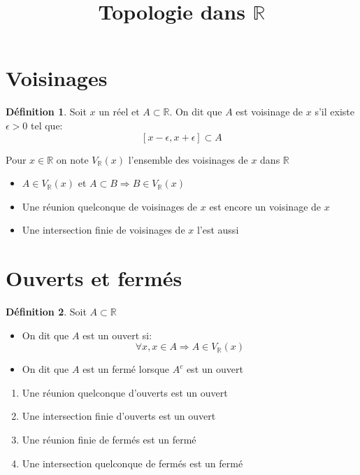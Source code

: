 \documentclass[fleqn]{article}
\title{Topologie dans $\mathbb{R}$}
\date{}
\theoremstyle{definition} \newtheorem*{defi}{D\'efinition}
\theoremstyle{definition} \newtheorem*{adh}{Caract\'erisation s\'equentielle de l'adh\'erence}
\theoremstyle{definition} \newtheorem*{fermitude}{Caract\'erisation s\'equentielle de la fermitude}
\theoremstyle{plain} \newtheorem*{theo}{Th\'eor\`eme}
\begin{document}
\maketitle

\section{Voisinages}
\begin{defi}
	Soit $x$ un r\'eel et $A \subset \mathbb{R}$. On dit que $A$ est voisinage de $x$ s'il existe $\epsilon > 0$ tel que:
	\[[x-\epsilon, x+\epsilon] \subset A\]
\end{defi}
Pour $x \in \mathbb{R}$ on note $V_\mathbb{R}(x)$ l'ensemble des voisinages de $x$ dans $\mathbb{R}$ \\
\begin{itemize}
	\item $A \in V_\mathbb{R}(x)$ et $A \subset B \Rightarrow B \in V_\mathbb{R}(x)$
	\item Une r\'eunion quelconque de voisinages de $x$ est encore un voisinage de $x$
	\item Une intersection finie de voisinages de $x$ l'est aussi
\end{itemize}

\section{Ouverts et ferm\'es}
\begin{defi}
	Soit $A \subset \mathbb{R}$
	\begin{itemize}
		\item On dit que $A$ est un ouvert si:
			\[\forall x, x \in A \Rightarrow A \in V_\mathbb{R}(x)\]
		\item On dit que $A$ est un ferm\'e lorsque $A^c$ est un ouvert \\
	\end{itemize}
\end{defi}
\begin{enumerate}
	\item Une r\'eunion quelconque d'ouverts est un ouvert
	\item Une intersection finie d'ouverts est un ouvert
	\item Une r\'eunion finie de ferm\'es est un ferm\'e
	\item Une intersection quelconque de ferm\'es est un ferm\'e
\end{enumerate}
\end{document}
